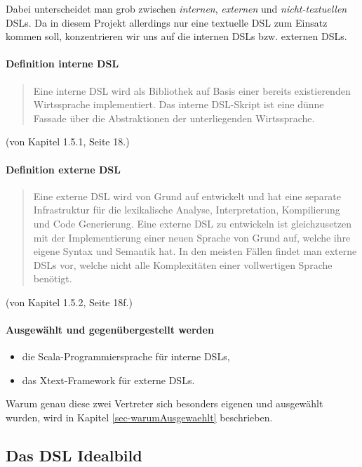 Dabei unterscheidet man grob zwischen \emph{internen}, \emph{externen}
und \emph{nicht-textuellen} DSLs.\cite{dsls} Da in diesem Projekt allerdings
nur eine textuelle DSL zum Einsatz kommen soll, konzentrieren wir uns
auf die internen DSLs bzw. externen DSLs.

\paragraph{Definition interne DSL}
\begin{quote}
Eine interne DSL wird als Bibliothek auf Basis
einer bereits existierenden Wirtssprache implementiert. Das interne DSL-Skript
ist eine dünne Fassade über die Abstraktionen der unterliegenden Wirtssprache.
\end{quote} (von \cite{dsls} Kapitel 1.5.1, Seite 18.)

\paragraph{Definition externe DSL}
\begin{quote}
Eine externe DSL wird von Grund auf entwickelt und hat eine separate
Infrastruktur für die lexikalische Analyse, Interpretation, Kompilierung
und Code Generierung. Eine externe DSL zu entwickeln ist gleichzusetzen mit
der Implementierung einer neuen Sprache von Grund auf, welche ihre eigene
Syntax und Semantik hat.
In den meisten Fällen findet man externe DSLs vor, welche nicht alle
Komplexitäten einer vollwertigen Sprache benötigt.
\end{quote} (von \cite{dsls} Kapitel 1.5.2, Seite 18f.)

\paragraph{Ausgewählt und gegenübergestellt werden}

\begin{itemize}
  \item die Scala-Programmiersprache für interne DSLs,
  \item das Xtext-Framework für externe DSLs.
\end{itemize}

Warum genau diese zwei Vertreter sich besonders eigenen und ausgewählt wurden,
wird in Kapitel \ref{sec-warumAusgewaehlt} beschrieben.



\subsection{Das DSL Idealbild}

